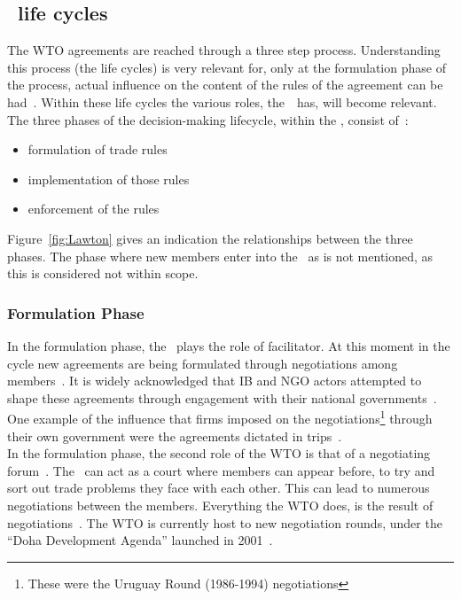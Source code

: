 \subsection[WTO Life cycles]{\wto~life cycles}
The WTO agreements are reached through a three step process. 
Understanding this process (the life cycles) is very relevant for, only at the formulation phase of the process, actual influence on the content of the rules of the agreement can be had~\citep{WTO:2012}.
Within these life cycles the various roles, the~\wto~has, will become relevant.
The three phases of the decision-making lifecycle, within the \wto, consist of~\citep{Lawton:2009vw}:

\begin{itemize}
\item formulation of trade rules
\item implementation of those rules
\item enforcement of the rules
\end{itemize}

Figure~\ref{fig:Lawton} gives an indication the relationships between the three phases. 
The phase where new members enter into the \wto~as is not mentioned, as this is considered not within scope.



\subsubsection{Formulation Phase}\label{sec:WTO:formulation_phase}
In the formulation phase, the \wto~plays the role of facilitator. 
At this moment in the cycle new agreements are being formulated through negotiations among members~\citep{WTO:2012}.
It is widely acknowledged that \gls{IB} and \gls{NGO} actors attempted to shape these agreements through engagement with their national governments~\citep{Lawton:2009vw}.
One example of the influence that firms imposed on the negotiations\footnote{These were the Uruguay Round (1986-1994) negotiations} through their own government were the agreements dictated in \gls{trips}~\citep{Lawton:2009vw}.\\
In the formulation phase, the second role of the WTO is that of a negotiating forum~\citep{WorldTradeOrganization:2008tz}.
The \wto~can act as a court where members can appear before, to try and sort out trade problems they face with each other.
This can lead to numerous negotiations between the members. 
Everything the WTO does, is the result of negotiations~\citep{WorldTradeOrganization:2008tz}.
The WTO is currently host to new negotiation rounds, under the “Doha Development Agenda” launched in 2001~\citep{WTO:2012}.



